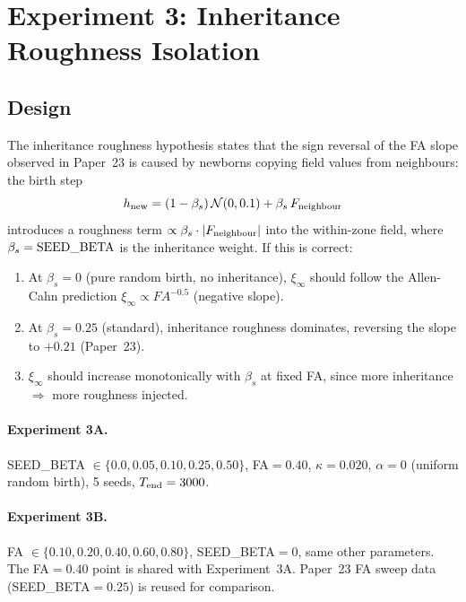 \documentclass[11pt]{article}
\begin{document}
\section{Experiment 3: Inheritance Roughness Isolation}

\subsection{Design}

The inheritance roughness hypothesis states that the sign reversal of
the FA slope observed in Paper~23 is caused by newborns copying field
values from neighbours: the birth step
\begin{equation}
  h_{\rm new} = (1-\beta_s)\,\mathcal{N}(0, 0.1)
                + \beta_s\,F_{\rm neighbour}
  \label{eq:birth}
\end{equation}
introduces a roughness term $\propto \beta_s \cdot |F_{\rm neighbour}|$
into the within-zone field, where $\beta_s = {\rm SEED\_BETA}$ is the
inheritance weight.
If this is correct:
\begin{enumerate}
  \item At $\beta_s=0$ (pure random birth, no inheritance), $\xi_\infty$
        should follow the Allen-Cahn prediction $\xi_\infty \propto FA^{-0.5}$
        (negative slope).
  \item At $\beta_s=0.25$ (standard), inheritance roughness dominates,
        reversing the slope to $+0.21$ (Paper~23).
  \item $\xi_\infty$ should increase monotonically with $\beta_s$ at fixed FA,
        since more inheritance $\Rightarrow$ more roughness injected.
\end{enumerate}

\paragraph{Experiment 3A.}
SEED\_BETA $\in \{0.0, 0.05, 0.10, 0.25, 0.50\}$, FA$=0.40$, $\kappa=0.020$,
$\alpha=0$ (uniform random birth), 5 seeds, $T_{\rm end}=3000$.

\paragraph{Experiment 3B.}
FA $\in \{0.10, 0.20, 0.40, 0.60, 0.80\}$, SEED\_BETA$=0$, same other
parameters.
The FA$=0.40$ point is shared with Experiment~3A.
Paper~23 FA sweep data (SEED\_BETA$=0.25$) is reused for comparison.
\end{document}
